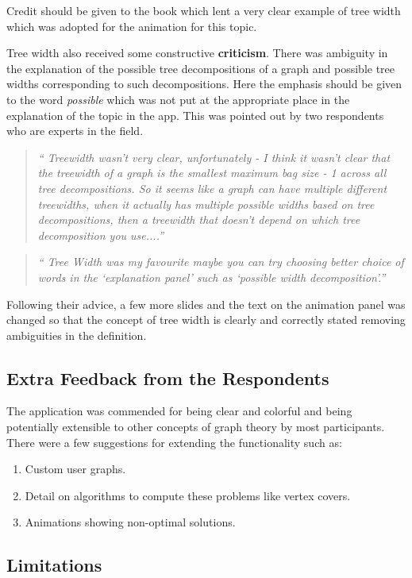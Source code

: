 Credit should be given to the book \cite{KleinbergTardos06} which lent a very
clear example of tree width which was adopted for the animation for this topic.

Tree width also received some constructive \textbf{criticism}. There was
ambiguity in the explanation of the possible tree decompositions of a graph and
possible tree widths corresponding to such decompositions. Here the emphasis
should be given to the word \emph{possible} which was not put at the appropriate
place in the explanation of the topic in the app. This was pointed out
by two respondents who are experts in the field. 

\begin{quote}
\emph{``
Treewidth wasn't very clear, unfortunately - I think it wasn't clear that the
treewidth of a graph is the smallest maximum bag size - 1 across all tree
decompositions. So it seems like a graph can have multiple different
treewidths, when it actually has multiple possible widths based on tree
decompositions, then a treewidth that doesn't depend on which tree
decomposition you use....''}
\end{quote}
\begin{quote}
\emph{``
Tree Width was my favourite maybe
you can try choosing better choice of words in the `explanation panel'  such as
`possible width decomposition'.''}
\end{quote}

Following their advice, a few more slides and the text on the animation panel
was changed so that the concept of tree width is clearly and correctly stated
removing ambiguities in the definition.


\subsection{Extra Feedback from the Respondents}
The application was commended for being clear and colorful and being
potentially extensible to other concepts of graph theory by most participants.
There were a few suggestions for extending the functionality such as:
\begin{enumerate}
\item Custom user graphs.
\item Detail on algorithms to compute these problems like vertex covers.
\item Animations showing non-optimal solutions.
\end{enumerate}


\subsection{Limitations}

